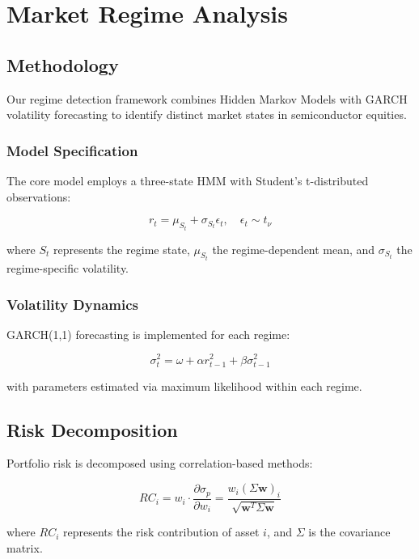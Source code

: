 \chapter{Market Regime Analysis}
\label{ch:regime}

\section{Methodology}
Our regime detection framework combines Hidden Markov Models with GARCH volatility forecasting to identify distinct market states in semiconductor equities.

\subsection{Model Specification}
The core model employs a three-state HMM with Student's t-distributed observations:

\begin{equation}
    r_t = \mu_{S_t} + \sigma_{S_t}\epsilon_t, \quad \epsilon_t \sim t_\nu
\end{equation}

where $S_t$ represents the regime state, $\mu_{S_t}$ the regime-dependent mean, and $\sigma_{S_t}$ the regime-specific volatility.

\subsection{Volatility Dynamics}
GARCH(1,1) forecasting is implemented for each regime:

\begin{equation}
    \sigma^2_t = \omega + \alpha r^2_{t-1} + \beta \sigma^2_{t-1}
\end{equation}

with parameters estimated via maximum likelihood within each regime.

\section{Risk Decomposition}
Portfolio risk is decomposed using correlation-based methods:

\begin{equation}
    RC_i = w_i \cdot \frac{\partial \sigma_p}{\partial w_i} = \frac{w_i(\Sigma \mathbf{w})_i}{\sqrt{\mathbf{w}^T \Sigma \mathbf{w}}}
\end{equation}

where $RC_i$ represents the risk contribution of asset $i$, and $\Sigma$ is the covariance matrix.

